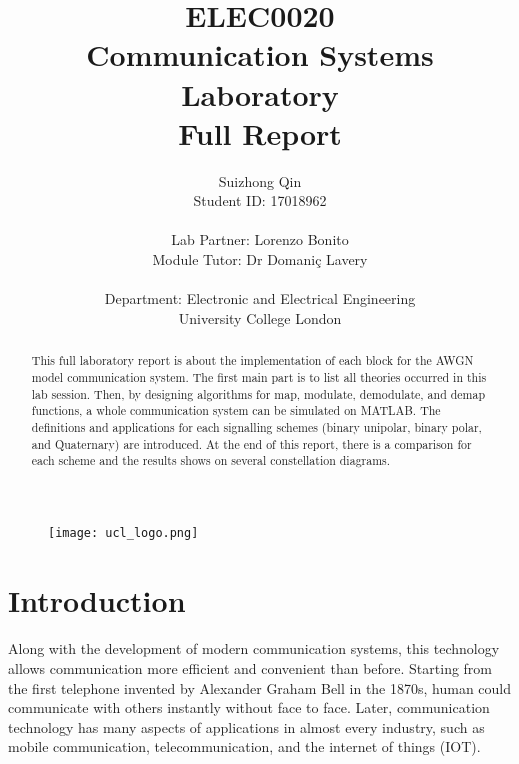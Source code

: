 \documentclass[12pt]{article}
\title{ELEC0020 \\Communication Systems Laboratory \\Full Report}
\author{Suizhong Qin \\Student ID: 17018962 \\ \\Lab Partner: Lorenzo Bonito\\Module Tutor: Dr  Domaniç Lavery \\ \\ Department: Electronic and Electrical Engineering \\ University College London}
\begin{document}
    \begin{figure}[t] %
    \centering
    \texttt{[image: ucl\_logo.png]}
    \end{figure}
    \maketitle
    \thispagestyle{empty}

    \newpage
    \pagestyle{empty}
    \begin{abstract}
    This full laboratory report is about the implementation of each block for the AWGN model communication system. The first main part is to list all theories occurred in this lab session. Then, by designing algorithms for map, modulate, demodulate, and demap functions, a whole communication system can be simulated on MATLAB. The definitions and applications for each signalling schemes (binary unipolar, binary polar, and Quaternary) are introduced. At the end of this report, there is a comparison for each scheme and the results shows on several constellation diagrams.
        
    \end{abstract}
    
 
    \newpage
    \tableofcontents
    \thispagestyle{empty}
    \setcounter{page}{0}
    
    \newpage
    \pagestyle{plain}
    \section{Introduction}
    \paragraph{}
    Along with the development of modern communication systems, this technology allows communication more efficient and convenient than before. Starting from the first telephone invented by Alexander Graham Bell in the 1870s, human could communicate with others instantly without face to face. Later, communication technology has many aspects of applications in almost every industry, such as mobile communication, telecommunication, and the internet of things (IOT). 
    
\end{document}

